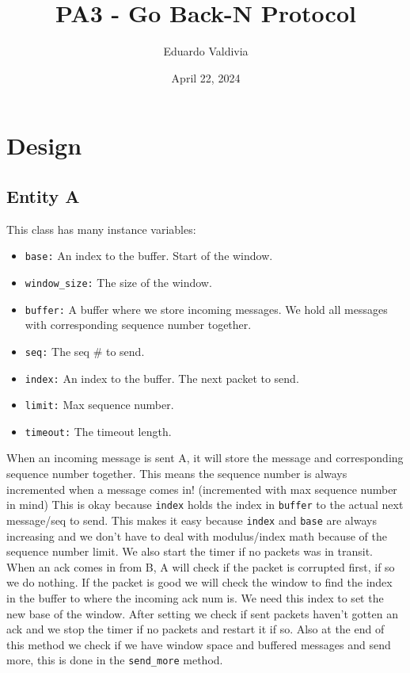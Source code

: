 \documentclass{article}
\title{PA3 - Go Back-N Protocol}
\date{April 22, 2024}
\author{Eduardo Valdivia}
\begin{document}
\maketitle
\section{Design}

\subsection{Entity A}
This class has many instance variables:
\begin{itemize}
\item \texttt{base:} An index to the buffer. Start of the window.
\item \texttt{window\_size:} The size of the window.
\item \texttt{buffer:} A buffer where we store incoming messages. We hold all messages with corresponding sequence number together.
\item \texttt{seq:} The seq \# to send.
\item \texttt{index:} An index to the buffer. The next packet to send.
\item \texttt{limit:} Max sequence number.
\item \texttt{timeout:} The timeout length.
\end{itemize}

\noindent When an incoming message is sent A, it will store the message and
corresponding sequence number together. This means the sequence number is always
incremented when a message comes in! (incremented with max sequence number in
mind) This is okay because \texttt{index} holds the index in \texttt{buffer} to
the actual next message/seq to send. This makes it easy because \texttt{index}
and \texttt{base} are always increasing and we don't have to deal with
modulus/index math because of the sequence number limit. We also start the timer
if no packets was in transit.\\


\noindent When an ack comes in from B, A will check if the packet is corrupted
first, if so we do nothing. If the packet is good we will check the window to
find the index in the buffer to where the incoming ack num is. We need this
index to set the new base of the window. After setting we check if sent packets
haven't gotten an ack and we stop the timer if no packets and restart it if so.
Also at the end of this method we check if we have window space and buffered
messages and send more, this is done in the \texttt{send\_more} method. \\
\end{document}
